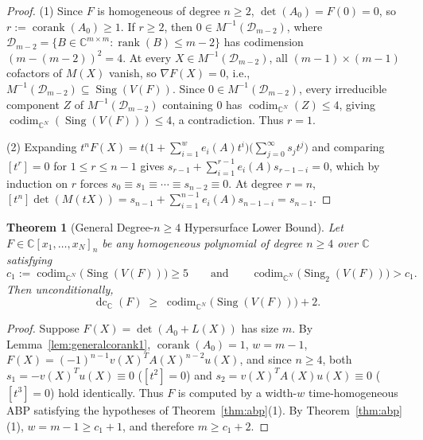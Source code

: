 \documentclass[11pt,a4paper]{article}
\newtheorem{theorem}{Theorem}[section]
\theoremstyle{definition}
\DeclareMathOperator{\dc}{dc}
\DeclareMathOperator{\codim}{codim}
\DeclareMathOperator{\Sing}{Sing}
\DeclareMathOperator{\rank}{rank}
\DeclareMathOperator{\corank}{corank}
\begin{document}
\begin{proof}
(1) Since $F$ is homogeneous of degree $n \ge 2$, $\det(A_0) = F(0) = 0$, so $r := \corank(A_0) \ge 1$. If $r \ge 2$, then $0 \in M^{-1}(\mathcal{D}_{m-2})$, where $\mathcal{D}_{m-2} = \{B \in \mathbb{C}^{m\times m} : \rank(B) \le m-2\}$ has codimension $(m - (m-2))^2 = 4$. At every $X \in M^{-1}(\mathcal{D}_{m-2})$, all $(m-1)\times(m-1)$ cofactors of $M(X)$ vanish, so $\nabla F(X) = 0$, i.e., $M^{-1}(\mathcal{D}_{m-2}) \subseteq \Sing(V(F))$. Since $0 \in M^{-1}(\mathcal{D}_{m-2})$, every irreducible component $Z$ of $M^{-1}(\mathcal{D}_{m-2})$ containing $0$ has $\codim_{\mathbb{C}^N}(Z) \le 4$, giving $\codim_{\mathbb{C}^N}(\Sing(V(F))) \le 4$, a contradiction. Thus $r = 1$.

(2) Expanding $t^n F(X) = t \big(1 + \sum_{i=1}^w e_i(A) t^i\big)\big(\sum_{j=0}^\infty s_j t^j\big)$ and comparing $[t^r] = 0$ for $1 \le r \le n-1$ gives $s_{r-1} + \sum_{i=1}^{r-1} e_i(A) s_{r-1-i} = 0$, which by induction on $r$ forces $s_0 \equiv s_1 \equiv \cdots \equiv s_{n-2} \equiv 0$. At degree $r = n$, $[t^n]\det(M(tX)) = s_{n-1} + \sum_{i=1}^{n-1} e_i(A) s_{n-1-i} = s_{n-1}$.
\end{proof}

\begin{theorem}[General Degree-$n \ge 4$ Hypersurface Lower Bound]\label{thm:generalplus2}
Let $F \in \mathbb{C}[x_1,\dots,x_N]_n$ be any homogeneous polynomial of degree $n \ge 4$ over $\mathbb{C}$ satisfying
\[
  c_1 := \codim_{\mathbb{C}^N}\big(\Sing(V(F))\big) \ge 5
  \qquad \text{and} \qquad
  \codim_{\mathbb{C}^N}\big(\Sing_2(V(F))\big) > c_1.
\]
Then unconditionally,
\[
  \dc_{\mathbb{C}}(F) \;\ge\; \codim_{\mathbb{C}^N}\big(\Sing(V(F))\big) + 2.
\]
\end{theorem}

\begin{proof}
Suppose $F(X) = \det(A_0 + L(X))$ has size $m$. By Lemma~\ref{lem:generalcorank1}, $\corank(A_0) = 1$, $w = m - 1$, $F(X) = (-1)^{n-1} v(X)^T A(X)^{n-2} u(X)$, and since $n \ge 4$, both $s_1 = -v(X)^T u(X) \equiv 0$ ($[t^2]=0$) and $s_2 = v(X)^T A(X) u(X) \equiv 0$ ($[t^3]=0$) hold identically. Thus $F$ is computed by a width-$w$ time-homogeneous ABP satisfying the hypotheses of Theorem~\ref{thm:abp}(1). By Theorem~\ref{thm:abp}(1), $w = m - 1 \ge c_1 + 1$, and therefore $m \ge c_1 + 2$.
\end{proof}
\end{document}
